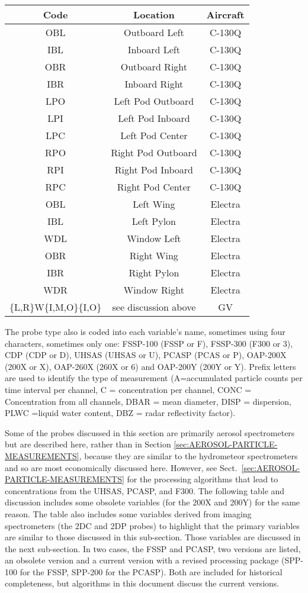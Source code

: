 \begin{center}
\begin{tabular}{|c|c|c|}
\hline 
\textbf{Code} & \textbf{Location} & \textbf{Aircraft}\tabularnewline
\hline 
\hline 
OBL  & Outboard Left  & C-130Q \tabularnewline
\hline 
IBL  & Inboard Left  & C-130Q \tabularnewline
\hline 
OBR  & Outboard Right  & C-130Q \tabularnewline
\hline 
IBR  & Inboard Right  & C-130Q \tabularnewline
\hline 
LPO  & Left Pod Outboard  & C-130Q \tabularnewline
\hline 
LPI  & Left Pod Inboard  & C-130Q \tabularnewline
\hline 
LPC  & Left Pod Center  & C-130Q \tabularnewline
\hline 
RPO  & Right Pod Outboard  & C-130Q \tabularnewline
\hline 
RPI  & Right Pod Inboard  & C-130Q \tabularnewline
\hline 
RPC  & Right Pod Center  & C-130Q \tabularnewline
\hline 
OBL  & Left Wing  & Electra \tabularnewline
\hline 
IBL  & Left Pylon  & Electra \tabularnewline
\hline 
WDL  & Window Left  & Electra \tabularnewline
\hline 
OBR  & Right Wing  & Electra \tabularnewline
\hline 
IBR  & Right Pylon  & Electra \tabularnewline
\hline 
WDR  & Window Right  & Electra \tabularnewline
\hline 
\{L,R\}W\{I,M,O\}\{I,O\} & see discussion above & GV\tabularnewline
\hline 
\end{tabular}
\par\end{center}

The probe type also is coded into each variable's name, sometimes
using four characters, sometimes only one: FSSP-100 (FSSP or F), FSSP-300
(F300 or 3), CDP (CDP or D), UHSAS (UHSAS or U), PCASP (PCAS or P),
OAP-200X (200X or X), OAP-260X (260X or 6) and OAP-200Y (200Y or Y).
Prefix letters are used to identify the type of measurement (A=accumulated
particle counts per time interval per channel, C = concentration per
channel, CONC = Concentration from all channels, DBAR = mean diameter,
DISP = dispersion, PLWC =liquid water content, DBZ = radar reflectivity
factor).

Some of the probes discussed in this section are primarily aerosol
spectrometers but are described here, rather than in Section \ref{sec:AEROSOL-PARTICLE-MEASUREMENTS},
because they are similar to the hydrometeor spectrometers and so are
most economically discussed here. However, see Sect.~\ref{sec:AEROSOL-PARTICLE-MEASUREMENTS}
for the processing algorithms that lead to concentrations from the
UHSAS, PCASP, and F300. The following table and discussion includes
some obsolete variables (for the 200X and 200Y) for the same reason.
The table also includes some variables derived from imaging spectrometers
(the 2DC and 2DP probes) to highlight that the primary variables are
similar to those discussed in this sub-section. Those variables are
discussed in the next sub-section. In two cases, the FSSP and PCASP,
two versions are listed, an obsolete version and a current version
with a revised processing package (SPP-100 for the FSSP, SPP-200 for
the PCASP). Both are included for historical completeness, but algorithms
in this document discuss the current versions.

